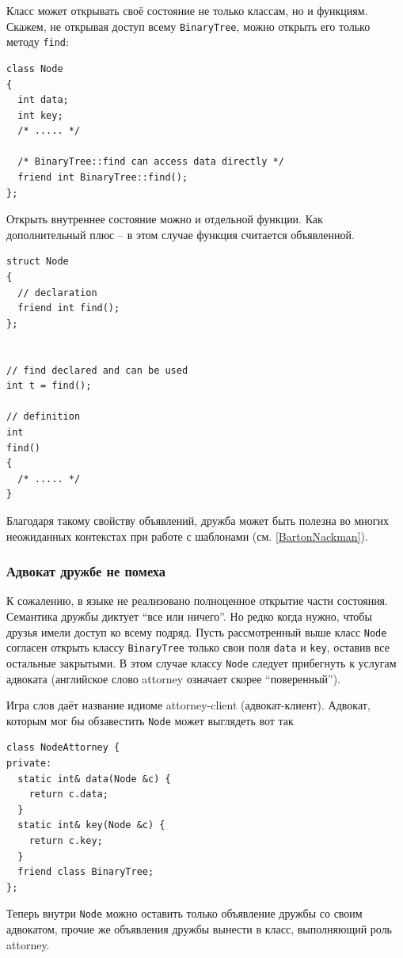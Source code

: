 \documentclass[a4paper,12pt,oneside]{article}
\begin{document}
Класс может открывать своё состояние не только классам, но и функциям. Скажем, не открывая доступ всему \lstinline!BinaryTree!, можно открыть его только методу \lstinline!find!:

\begin{lstlisting}
class Node
{
  int data;
  int key;
  /* ..... */

  /* BinaryTree::find can access data directly */
  friend int BinaryTree::find();
};
\end{lstlisting}

Открыть внутреннее состояние можно и отдельной функции. Как дополнительный плюс -- в этом случае функция считается объявленной.

\begin{lstlisting}
struct Node
{
  // declaration
  friend int find();
};


// find declared and can be used
int t = find();

// definition
int
find() 
{
  /* ..... */
}
\end{lstlisting}

Благодаря такому свойству объявлений, дружба может быть полезна во многих неожиданных контекстах при работе с шаблонами (см. \ref{BartonNackman}).

\subsubsection{Адвокат дружбе не помеха}

К сожалению, в языке не реализовано полноценное открытие части состояния. Семантика дружбы диктует ``все или ничего''. Но редко когда нужно, чтобы друзья имели доступ ко всему подряд. Пусть рассмотренный выше класс \lstinline!Node! согласен открыть классу \lstinline!BinaryTree! только свои поля \lstinline!data! и \lstinline!key!, оставив все остальные закрытыми. В этом случае классу \lstinline!Node! следует прибегнуть к услугам адвоката (английское слово attorney означает скорее ``поверенный'').

Игра слов даёт название идиоме attorney-client (адвокат-клиент). Адвокат, которым мог бы обзавестить \lstinline!Node! может выглядеть вот так

\begin{lstlisting}
class NodeAttorney {
private:
  static int& data(Node &c) {
    return c.data;
  } 
  static int& key(Node &c) {
    return c.key;
  } 
  friend class BinaryTree;
};
\end{lstlisting}

Теперь внутри \lstinline!Node! можно оставить только объявление дружбы со своим адвокатом, прочие же объявления дружбы вынести в класс, выполняющий роль attorney.
\end{document}
